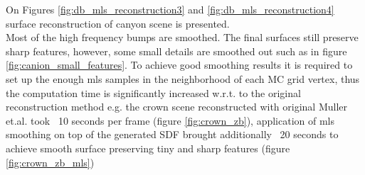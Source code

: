 On Figures \ref{fig:db_mls_reconstruction3} and \ref{fig:db_mls_reconstruction4} surface reconstruction of canyon scene is presented.\\
Most of the high frequency bumps are smoothed. The final surfaces still preserve sharp features, however, some small details are smoothed out such as in figure \ref{fig:canion_small_features}. To achieve good smoothing results it is required to set up the enough mls samples in the neighborhood of each MC grid vertex, thus the computation time is significantly increased w.r.t. to the original reconstruction method e.g. the crown scene reconstructed with original Muller et.al. took ~10 seconds per frame (figure \ref{fig:crown_zb}), application of mls smoothing on top of the generated SDF brought additionally ~20 seconds to achieve smooth surface preserving tiny and sharp features (figure \ref{fig:crown_zb_mls}) 

